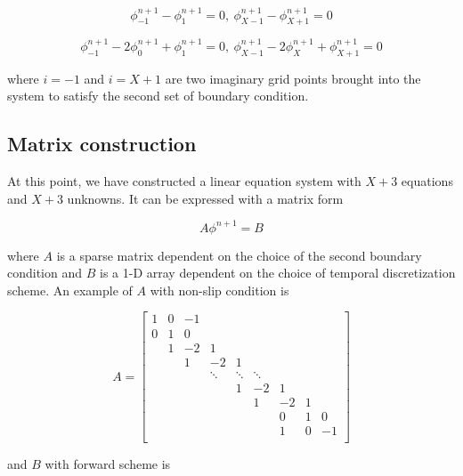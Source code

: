 \documentclass[12pt]{article}
\begin{document}
\begin{equation}
\phi_{-1}^{n+1}-\phi_{1}^{n+1}=0,~\phi_{X-1}^{n+1}-\phi_{X+1}^{n+1}=0
\label{eq:bcdes2}
\end{equation}

\begin{equation}
\phi_{-1}^{n+1}-2\phi_{0}^{n+1}+\phi_{1}^{n+1}=0,~\phi_{X-1}^{n+1}-2\phi_{X}^{n+1}+\phi_{X+1}^{n+1}=0
\label{eq:bcdes3}
\end{equation}

where $i=-1$ and $i=X+1$ are two imaginary grid points brought into the system to satisfy the second set of boundary condition.\\

\subsection{Matrix construction}
At this point, we have constructed a linear equation system with $X+3$ equations and $X+3$ unknowns. It can be expressed with a matrix form

\begin{equation}
A\phi^{n+1}=B
\end{equation}

where $A$ is a sparse matrix dependent on the choice of the second boundary condition and $B$ is a 1-D array dependent on the choice of temporal discretization scheme. An example of $A$ with non-slip condition is

\begin{equation}
A=\begin{bmatrix} 
			1 & 0 & -1 & & & & & & \\
			0 & 1 & 0 & & & & & & \\
			   &1 & -2 & 1 & & & & & \\
			   & & 1 & -2 & 1 & & & & \\
			   & & & \ddots & \ddots & \ddots & & & \\ 
			   & & & & 1 & -2 & 1 & & \\
			   & & & & & 1 & -2 & 1 & \\
			   & & & & & & 0 & 1 & 0 \\
			   & & & & & & 1 & 0 & -1 \\
	\end{bmatrix}
\label{eq:matrix}
\end{equation}

and $B$ with forward scheme is
\end{document}
